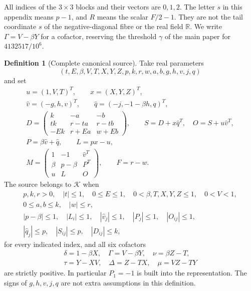 \documentclass[11pt,reqno]{amsart}
\theoremstyle{definition}
\newtheorem{definition}[theorem]{Definition}
\theoremstyle{remark}
\newcommand{\R}{\mathbb R}
\newcommand{\gam}{\gamma}
\begin{document}
All indices of the \(3\times3\) blocks and their vectors are
\(0,1,2\). The letter \(s\) in this appendix means \(p-1\), and
\(R\) means the scalar \(F/2-1\). They are not the tail coordinate
\(s\) of the negative-diagonal fibre or the real field \(\R\).
We write \(\Gamma=V-\beta Y\) for a cofactor, reserving the
threshold \(\gam\) of the main paper for \(4132517/10^6\).

\begin{definition}[Complete canonical source]\label{s3:canonical-domain}
Take real parameters
\[
 (t,E,\beta,V,T,X,Y,Z,p,k,r,w,a,b,g,h,v,j,q)
\]
and set
\begin{equation}\label{s3:physical-matrix}
\begin{gathered}
 u=(1,V,T)^T,\qquad x=(X,Y,Z)^T,\\
 \widehat v=(-g,h,v)^T,\qquad
 \widehat q=(-j,-1-\beta h,q)^T,\\
 D=\begin{pmatrix}
 k&-a&-b\\ tk&r-ta&r-tb\\ -Ek&r+Ea&w+Eb
 \end{pmatrix},\qquad
 S=D+x\widehat q^T,\quad O=S+u\widehat v^T,\\
 P=\beta\widehat v+\widehat q,\qquad L=px-u,\\
 M=\begin{pmatrix}
 1&-1&\widehat v^T\\
 \beta&p-\beta&P^T\\
 u&L&O
 \end{pmatrix},\qquad F=r-w.
\end{gathered}
\end{equation}
The source belongs to \(\mathcal K\) when
\begin{equation}\label{s3:outer-physical}
\begin{gathered}
 p,k,r>0,\quad |t|\le1,\quad0\le E\le1,\quad
 0<\beta,T,X,Y,Z\le1,\quad0<V<1,\\
 0\le a,b\le k,\quad |w|\le r,\\
 |p-\beta|\le1,\quad |L_i|\le1,\quad
 |\widehat v_j|\le1,\quad |P_j|\le1,\quad |O_{ij}|\le1,\\
 |\widehat q_j|\le p,\quad |S_{ij}|\le p,\quad |D_{ij}|\le k,
\end{gathered}
\end{equation}
for every indicated index, and all six cofactors
\begin{equation}\label{s3:six-cofactors}
\begin{gathered}
\delta=1-\beta X,\quad\Gamma=V-\beta Y,\quad\nu=\beta Z-T,\\
\tau=Y-XV,\quad\Delta=Z-TX,\quad\mu=VZ-TY
\end{gathered}
\end{equation}
are strictly positive. In particular \(P_1=-1\) is built into the
representation. The signs of \(g,h,v,j,q\) are not extra assumptions
in this definition.
\end{definition}
\end{document}
